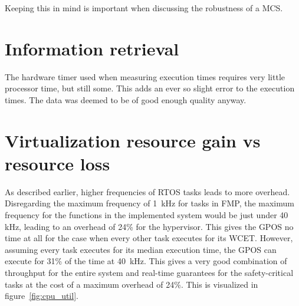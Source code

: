 Keeping this in mind is important when discussing the robustness of a MCS.


\section{Information retrieval}
The hardware timer used when measuring execution times requires very little processor time, but still some. This adds an ever so slight error to the execution times. The data was deemed to be of good enough quality anyway.


\section{Virtualization resource gain vs resource loss}
As described earlier, higher frequencies of RTOS tasks leads to more overhead. Disregarding the maximum frequency of 1~kHz for tasks in FMP, the maximum frequency for the functions in the implemented system would be just under 40 kHz, leading to an overhead of 24\% for the hypervisor. This gives the GPOS no time at all for the case when every other task executes for its WCET. However, assuming every task executes for its median execution time, the GPOS can execute for 31\% of the time at 40~kHz. This gives a very good combination of throughput for the entire system and real-time guarantees for the safety-critical tasks at the cost of a maximum overhead of 24\%. This is visualized in figure~\ref{fig:cpu_util}.

